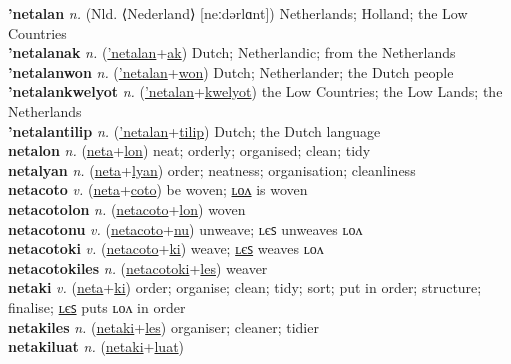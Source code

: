 \textbf{'netalan} \textit{n.} (Nld. ⟨Nederland⟩ [neːdərlɑnt])
Netherlands; Holland; the Low Countries \label{'netalan} \\
\textbf{'netalanak} \textit{n.} (\hyperref['netalan]{'netalan}+\hyperref[ak]{ak})
Dutch; Netherlandic; from the Netherlands \label{'netalanak} \\
\textbf{'netalanwon} \textit{n.} (\hyperref['netalan]{'netalan}+\hyperref[won]{won})
Dutch; Netherlander; the Dutch people \label{'netalanwon} \\
\textbf{'netalankwelyot} \textit{n.} (\hyperref['netalan]{'netalan}+\hyperref[kwelyot]{kwelyot})
the Low Countries; the Low Lands; the Netherlands \label{'netalankwelyot} \\
\textbf{'netalantilip} \textit{n.} (\hyperref['netalan]{'netalan}+\hyperref[tilip]{tilip})
Dutch; the Dutch language \label{'netalantilip} \\
\textbf{netalon} \textit{n.} (\hyperref[neta]{neta}+\hyperref[lon]{lon})
neat; orderly; organised; clean; tidy \label{netalon} \\
\textbf{netalyan} \textit{n.} (\hyperref[neta]{neta}+\hyperref[lyan]{lyan})
order; neatness; organisation; cleanliness \label{netalyan} \\
\textbf{netacoto} \textit{v.} (\hyperref[neta]{neta}+\hyperref[coto]{coto})
be woven; \hyperref[netacotolon]{ʟᴏᴧ} is woven \label{netacoto} \\
\textbf{netacotolon} \textit{n.} (\hyperref[netacoto]{netacoto}+\hyperref[lon]{lon})
woven \label{netacotolon} \\
\textbf{netacotonu} \textit{v.} (\hyperref[netacoto]{netacoto}+\hyperref[nu]{nu})
unweave; ʟєꜱ unweaves ʟᴏᴧ \label{netacotonu} \\
\textbf{netacotoki} \textit{v.} (\hyperref[netacoto]{netacoto}+\hyperref[ki]{ki})
weave; \hyperref[netacotokiles]{ʟєꜱ} weaves ʟᴏᴧ \label{netacotoki} \\
\textbf{netacotokiles} \textit{n.} (\hyperref[netacotoki]{netacotoki}+\hyperref[les]{les})
weaver \label{netacotokiles} \\
\textbf{netaki} \textit{v.} (\hyperref[neta]{neta}+\hyperref[ki]{ki})
order; organise; clean; tidy; sort; put in order; structure; finalise; \hyperref[netakiles]{ʟєꜱ} puts ʟᴏᴧ in order \label{netaki} \\
\textbf{netakiles} \textit{n.} (\hyperref[netaki]{netaki}+\hyperref[les]{les})
organiser; cleaner; tidier \label{netakiles} \\
\textbf{netakiluat} \textit{n.} (\hyperref[netaki]{netaki}+\hyperref[luat]{luat})

